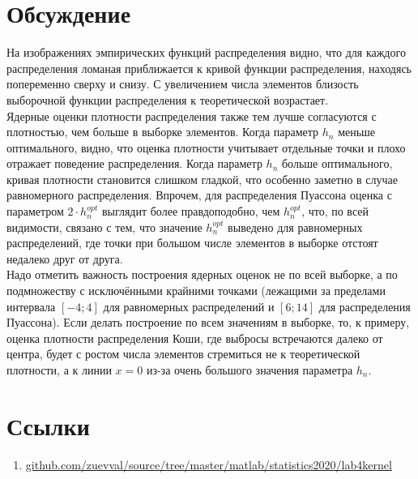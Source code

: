 \documentclass[main.tex]{subfiles}
\begin{document}
\newpage
\section{Обсуждение}
На изображениях эмпирических функций распределения видно, что для каждого распределения ломаная приближается к кривой функции распределения, находясь попеременно сверху и снизу. С увеличением числа элементов близость выборочной функции распределения к теоретической возрастает.\\
Ядерные оценки плотности распределения также тем лучше согласуются с плотностью, чем больше в выборке элементов. Когда параметр $h_n$ меньше оптимального, видно, что оценка плотности учитывает отдельные точки и плохо отражает  поведение распределения. Когда параметр $h_n$ больше оптимального, кривая плотности становится слишком гладкой, что особенно заметно в случае равномерного распределения. Впрочем, для распределения Пуассона оценка с параметром $2\cdot h_n^{opt}$ выглядит более правдоподобно, чем $h_n^{opt}$, что, по всей видимости, связано с тем, что значение $h_n^{opt}$ выведено для равномерных распределений, где точки при большом числе элементов в выборке отстоят недалеко друг от друга.\\
Надо отметить важность построения ядерных оценок не по всей выборке, а по подмножеству с исключёнными крайними точками (лежащими за пределами интервала $[-4;4]$ для равномерных распределений и $[6;14]$ для распределения Пуассона). Если делать построение по всем значениям в выборке, то, к примеру, оценка плотности распределения Коши, где выбросы встречаются далеко от центра, будет с ростом числа элементов стремиться не к теоретической плотности, а к линии $x=0$ из-за очень большого значения параметра $h_n$.

\newpage
\section{Ссылки}
\begin{enumerate}
	\item \href{https://github.com/zuevval/source/tree/master/matlab/statistics2020/lab4kernel}{github.com/zuevval/source/tree/master/matlab/statistics2020/lab4kernel} \label{link:lab4}
\end{enumerate}
\end{document}
